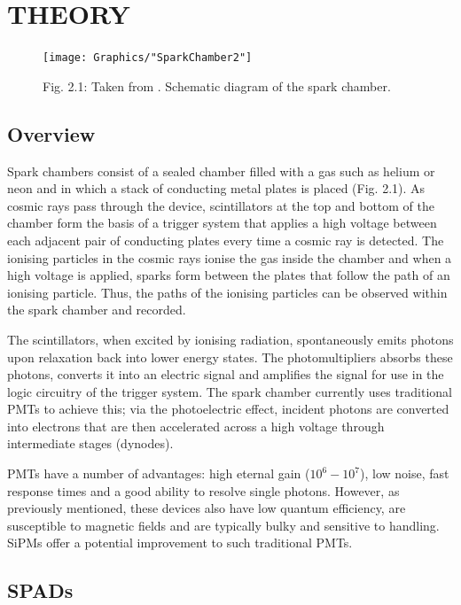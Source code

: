 
\section{THEORY}

\begin{figure}
  \centering
  \hfill\texttt{[image: Graphics/"SparkChamber2"]}\hspace*{\fill}
  {\caption*{Fig. 2.1: Taken from \cite{HEPscatter}. Schematic diagram of the spark chamber.}}
\end{figure}

\subsection{Overview}

Spark chambers consist of a sealed chamber filled with a gas such as helium or neon and in which a stack of conducting metal plates is placed (Fig. 2.1). As cosmic rays pass through the device, scintillators at the top and bottom of the chamber form the basis of a trigger system that applies a high voltage between each adjacent pair of conducting plates every time a cosmic ray is detected. The ionising particles in the cosmic rays ionise the gas inside the chamber and when a high voltage is applied, sparks form between the plates that follow the path of an ionising particle. Thus, the paths of the ionising particles can be observed within the spark chamber and recorded. \cite{HEPscatter}

The scintillators, when excited by ionising radiation, spontaneously emits photons upon relaxation back into lower energy states. The photomultipliers absorbs these photons, converts it into an electric signal and amplifies the signal for use in the logic circuitry of the trigger system. The spark chamber currently uses traditional PMTs to achieve this; via the photoelectric effect, incident photons are converted into electrons that are then accelerated across a high voltage through intermediate stages (dynodes). \cite{polyakov2013}

PMTs have a number of advantages: high eternal gain (\(10^6-10^7\)), low noise, fast response times and a good ability to resolve single photons. However, as previously mentioned, these devices also have low quantum efficiency, are susceptible to magnetic fields and are typically bulky and sensitive to handling. \cite{dinu2007} SiPMs offer a potential improvement to such traditional PMTs.

\subsection{SPADs}

